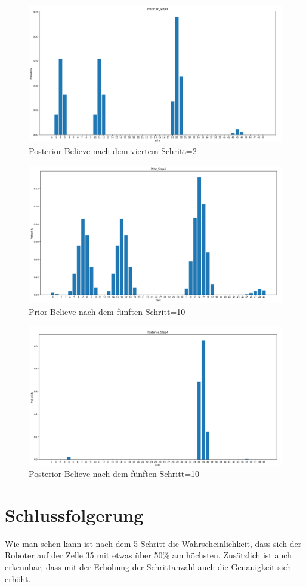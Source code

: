 \documentclass[12pt]{article}
\begin{document}
\begin{figure}[h]
    \centering
    \includegraphics[width=1.3\textwidth]{img/posterior_step_3.png}
    \caption{Posterior Believe nach dem viertem Schritt=2}
    \label{fig:Posterior Believe nach dem viertem Schritt=2}
\end{figure}

\begin{figure}[h]
    \centering
    \includegraphics[width=1.3\textwidth]{img/prior_step_4.png}
    \caption{Prior Believe nach dem fünften Schritt=10}
    \label{fig:Prior Believe nach dem fünften Schritt=10}
\end{figure}

\begin{figure}[h]
    \centering
    \includegraphics[width=1.3\textwidth]{img/posterior_step_4.png}
    \caption{Posterior Believe nach dem fünften Schritt=10}
    \label{fig:Posterior Believe nach dem fünften Schritt=10}
\end{figure}

\section{Schlussfolgerung}
Wie man sehen kann ist nach dem 5 Schritt die Wahrscheinlichkeit, dass sich der Roboter auf der Zelle 35 mit etwas über 50\% am höchsten. Zusätzlich ist auch erkennbar, dass mit der Erhöhung der Schrittanzahl auch die Genauigkeit sich erhöht.
\end{document}
